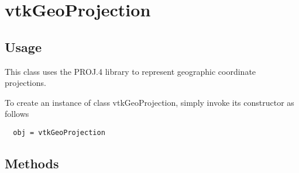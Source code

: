 \section{vtkGeoProjection}

\subsection{Usage}

 This class uses the PROJ.4 library to represent geographic coordinate
 projections.

To create an instance of class vtkGeoProjection, simply
invoke its constructor as follows
\begin{verbatim}
  obj = vtkGeoProjection
\end{verbatim}
\subsection{Methods}

